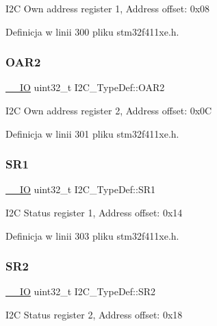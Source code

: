 I2C Own address register 1, Address offset\+: 0x08 

Definicja w linii 300 pliku stm32f411xe.\+h.

\mbox{\label{struct_i2_c___type_def_a73988a218be320999c74a641b3d6e3c1}} 
\subsubsection{\texorpdfstring{O\+A\+R2}{OAR2}}
{\footnotesize\ttfamily \hyperlink{core__sc300_8h_aec43007d9998a0a0e01faede4133d6be}{\+\_\+\+\_\+\+IO} uint32\+\_\+t I2\+C\+\_\+\+Type\+Def\+::\+O\+A\+R2}

I2C Own address register 2, Address offset\+: 0x0C 

Definicja w linii 301 pliku stm32f411xe.\+h.

\mbox{\label{struct_i2_c___type_def_a639be124227c03bb3f5fe0e7faf84995}} 
\subsubsection{\texorpdfstring{S\+R1}{SR1}}
{\footnotesize\ttfamily \hyperlink{core__sc300_8h_aec43007d9998a0a0e01faede4133d6be}{\+\_\+\+\_\+\+IO} uint32\+\_\+t I2\+C\+\_\+\+Type\+Def\+::\+S\+R1}

I2C Status register 1, Address offset\+: 0x14 

Definicja w linii 303 pliku stm32f411xe.\+h.

\mbox{\label{struct_i2_c___type_def_ac509048af4b9ac67c808d584fdbc712e}} 
\subsubsection{\texorpdfstring{S\+R2}{SR2}}
{\footnotesize\ttfamily \hyperlink{core__sc300_8h_aec43007d9998a0a0e01faede4133d6be}{\+\_\+\+\_\+\+IO} uint32\+\_\+t I2\+C\+\_\+\+Type\+Def\+::\+S\+R2}

I2C Status register 2, Address offset\+: 0x18 

